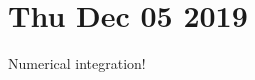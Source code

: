 \documentclass[main.tex]{subfiles}
\begin{document}
\section*{Thu Dec 05 2019}

Numerical integration! 
\end{document}
